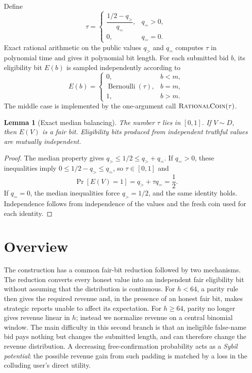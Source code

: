 \documentclass[11pt]{article}
\newtheorem{lemma}{Lemma}[section]
\begin{document}
Define
\begin{equation}
\tau=
\begin{cases}
\dfrac{1/2-q_{>}}{q_{=}},&q_{=}>0,\\[1ex]
0,&q_{=}=0.
\end{cases}
\label{eq:tau}
\end{equation}
Exact rational arithmetic on the public values $q_{>}$ and $q_{=}$ computes
$\tau$ in polynomial time and gives it polynomial bit length.
For each submitted bid $b$, its eligibility bit $E(b)$ is sampled independently
according to
\begin{equation}
E(b)=
\begin{cases}
0,&b<m,\\
\operatorname{Bernoulli}(\tau),&b=m,\\
1,&b>m.
\end{cases}
\label{eq:eligibility}
\end{equation}
The middle case is implemented by the one-argument call
$\text{\textsc{RationalCoin}}(\tau)$.

\begin{lemma}[Exact median balancing]
\label{lem:balanced-median}
The number $\tau$ lies in $[0,1]$.  If $V\sim D$, then $E(V)$ is a fair bit.
Eligibility bits produced from independent truthful values are mutually
independent.
\end{lemma}

\begin{proof}
The median property gives
$q_{>}\le1/2\le q_{>}+q_{=}$.  If $q_{=}>0$, these inequalities imply
$0\le1/2-q_{>}\le q_{=}$, so $\tau\in[0,1]$ and
\[
\Pr[E(V)=1]=q_{>}+\tau q_{=}=\frac12.
\]
If $q_{=}=0$, the median inequalities force $q_{>}=1/2$, and the same identity
holds.  Independence follows from independence of the values and the fresh
coin used for each identity.
\end{proof}

\section{Overview}
\label{sec:overview}

The construction has a common fair-bit reduction followed by two mechanisms.
The reduction converts every honest value into an independent fair eligibility
bit without assuming that the distribution is continuous.  For $h<64$, a
parity rule then gives the required revenue and, in the presence of an honest
fair bit, makes strategic reports unable to affect its expectation.  For
$h\ge64$, parity no longer gives revenue linear in $h$; instead we normalize
revenue on a central binomial window.  The main
difficulty in this second branch is that an ineligible false-name bid pays
nothing but changes the submitted length, and can therefore change the revenue
distribution.  A decreasing free-confirmation probability acts as a
\emph{Sybil potential}: the possible revenue gain from such padding is matched
by a loss in the colluding user's direct utility.
\end{document}
